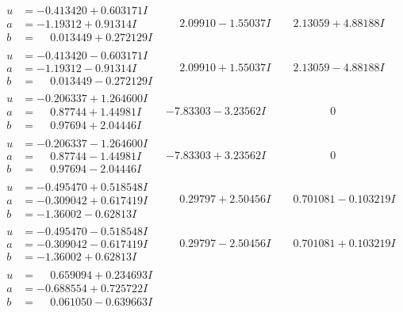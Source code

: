 \documentclass[1p]{elsarticle_modified}
\theoremstyle{definition}
\begin{document}
$$\begin{array}{c|c|c}
\begin{aligned}
u &= -0.413420 + 0.603171 I \\
a &= -1.19312 + 0.91314 I \\
b &= \phantom{-}0.013449 + 0.272129 I\end{aligned}
 & \phantom{-}2.09910 - 1.55037 I & \phantom{-}2.13059 + 4.88188 I \\ \hline\begin{aligned}
u &= -0.413420 - 0.603171 I \\
a &= -1.19312 - 0.91314 I \\
b &= \phantom{-}0.013449 - 0.272129 I\end{aligned}
 & \phantom{-}2.09910 + 1.55037 I & \phantom{-}2.13059 - 4.88188 I \\ \hline\begin{aligned}
u &= -0.206337 + 1.264600 I \\
a &= \phantom{-}0.87744 + 1.44981 I \\
b &= \phantom{-}0.97694 + 2.04446 I\end{aligned}
 & -7.83303 - 3.23562 I & \phantom{-0.000000 } 0 \\ \hline\begin{aligned}
u &= -0.206337 - 1.264600 I \\
a &= \phantom{-}0.87744 - 1.44981 I \\
b &= \phantom{-}0.97694 - 2.04446 I\end{aligned}
 & -7.83303 + 3.23562 I & \phantom{-0.000000 } 0 \\ \hline\begin{aligned}
u &= -0.495470 + 0.518548 I \\
a &= -0.309042 + 0.617419 I \\
b &= -1.36002 - 0.62813 I\end{aligned}
 & \phantom{-}0.29797 + 2.50456 I & \phantom{-}0.701081 - 0.103219 I \\ \hline\begin{aligned}
u &= -0.495470 - 0.518548 I \\
a &= -0.309042 - 0.617419 I \\
b &= -1.36002 + 0.62813 I\end{aligned}
 & \phantom{-}0.29797 - 2.50456 I & \phantom{-}0.701081 + 0.103219 I \\ \hline\begin{aligned}
u &= \phantom{-}0.659094 + 0.234693 I \\
a &= -0.688554 + 0.725722 I \\
b &= \phantom{-}0.061050 - 0.639663 I\end{aligned}

\end{array}$$
\end{document}
